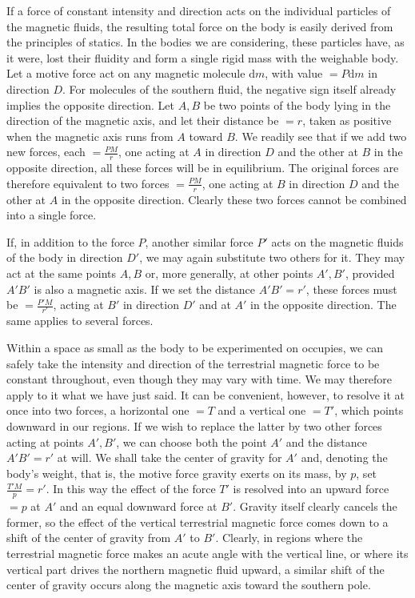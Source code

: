 If a force of constant intensity and direction acts on the individual particles of the magnetic fluids, the resulting total force on the body is easily derived from the principles of statics. In the bodies we are considering, these particles have, as it were, lost their fluidity and form a single rigid mass with the weighable body. Let a motive force act on any magnetic molecule $\mathrm{d}m$, with value $=P\mathrm{d}m$ in direction $D$. For molecules of the southern fluid, the negative sign itself already implies the opposite direction. Let $A,B$ be two points of the body lying in the direction of the magnetic axis, and let their distance be $=r$, taken as positive when the magnetic axis runs from $A$ toward $B$. We readily see that if we add two new forces, each $=\frac{PM}{r}$, one acting at $A$ in direction $D$ and the other at $B$ in the opposite direction, all these forces will be in equilibrium. The original forces are therefore equivalent to two forces $=\frac{PM}{r}$, one acting at $B$ in direction $D$ and the other at $A$ in the opposite direction. Clearly these two forces cannot be combined into a single force.

If, in addition to the force $P$, another similar force $P'$ acts on the magnetic fluids of the body in direction $D'$, we may again substitute two others for it. They may act at the same points $A,B$ or, more generally, at other points $A',B'$, provided $A'B'$ is also a magnetic axis. If we set the distance $A'B'=r'$, these forces must be $=\frac{P'M}{r'}$, acting at $B'$ in direction $D'$ and at $A'$ in the opposite direction. The same applies to several forces.

Within a space as small as the body to be experimented on occupies, we can safely take the intensity and direction of the terrestrial magnetic force to be constant throughout, even though they may vary with time. We may therefore apply to it what we have just said. It can be convenient, however, to resolve it at once into two forces, a horizontal one $=T$ and a vertical one $=T'$, which points downward in our regions. If we wish to replace the latter by two other forces acting at points $A',B'$, we can choose both the point $A'$ and the distance $A'B'=r'$ at will. We shall take the center of gravity for $A'$ and, denoting the body's weight, that is, the motive force gravity exerts on its mass, by $p$, set $\frac{T'M}{p}=r'$. In this way the effect of the force $T'$ is resolved into an upward force $=p$ at $A'$ and an equal downward force at $B'$. Gravity itself clearly cancels the former, so the effect of the vertical terrestrial magnetic force comes down to a shift of the center of gravity from $A'$ to $B'$. Clearly, in regions where the terrestrial magnetic force makes an acute angle with the vertical line, or where its vertical part drives the northern magnetic fluid upward, a similar shift of the center of gravity occurs along the magnetic axis toward the southern pole.

